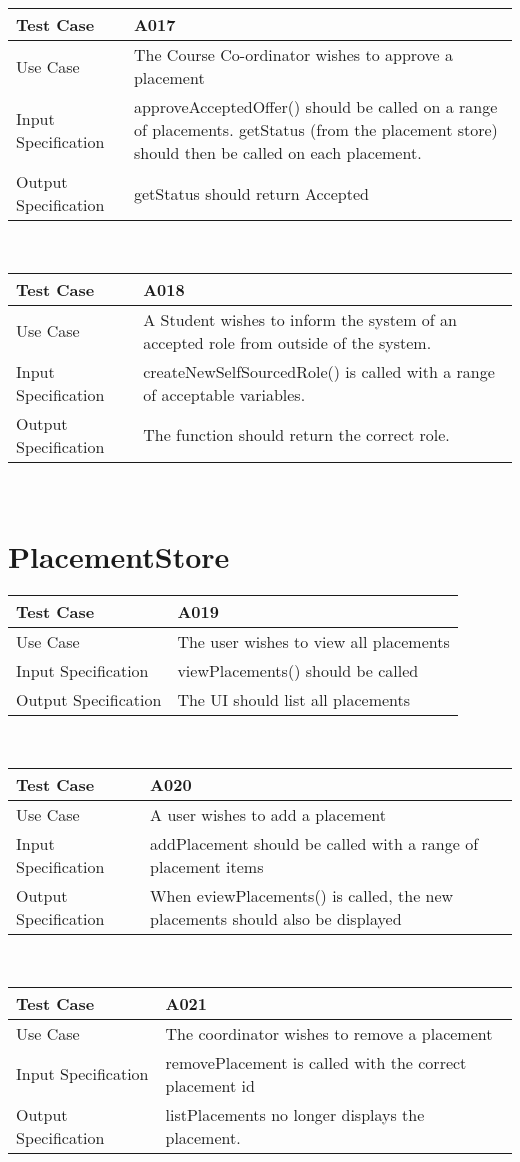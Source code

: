 \documentclass[12pt,a4paper,english,intoc,bibliography=totoc,index=totoc,BCOR10mm,captions=tableheading,titlepage,fleqn]{scrbook}
\providecommand{\tabularnewline}{\\}
\begin{document}
\begin{tabular}{lp{10cm}}
\hline 
\textbf{Test Case} & A017\tabularnewline
\hline 
\hline 
Use Case & The Course Co-ordinator wishes to approve a placement\tabularnewline
\hline 
Input Specification & approveAcceptedOffer() should be called on a range of placements. getStatus (from the placement store) should then be called on each placement.\tabularnewline
\hline 
Output Specification & getStatus should return Accepted\tabularnewline
\hline 
\end{tabular}\\

\begin{tabular}{lp{10cm}}
\hline 
\textbf{Test Case} & A018\tabularnewline
\hline 
\hline 
Use Case & A Student wishes to inform the system of an accepted role from outside of the system.\tabularnewline
\hline 
Input Specification & createNewSelfSourcedRole() is called with a range of acceptable variables.\tabularnewline
\hline 
Output Specification & The function should return the correct role.\tabularnewline
\hline 
\end{tabular}\\

\section*{PlacementStore}

\begin{tabular}{lp{10cm}}
\hline 
\textbf{Test Case} & A019\tabularnewline
\hline 
\hline 
Use Case & The user wishes to view all placements\tabularnewline
\hline 
Input Specification & viewPlacements() should be called\tabularnewline
\hline 
Output Specification & The UI should list all placements\tabularnewline
\hline 
\end{tabular}\\

\begin{tabular}{lp{10cm}}
\hline 
\textbf{Test Case} & A020\tabularnewline
\hline 
\hline 
Use Case & A user wishes to add a placement\tabularnewline
\hline 
Input Specification & addPlacement should be called with a range of placement items\tabularnewline
\hline 
Output Specification & When eviewPlacements() is called, the new placements should also be displayed\tabularnewline
\hline 
\end{tabular}\\

\begin{tabular}{lp{10cm}}
\hline 
\textbf{Test Case} & A021\tabularnewline
\hline 
\hline 
Use Case & The coordinator wishes to remove a placement\tabularnewline
\hline 
Input Specification & removePlacement is called with the correct placement id\tabularnewline
\hline 
Output Specification & listPlacements no longer displays the placement.\tabularnewline
\hline 
\end{tabular}\\
\end{document}
